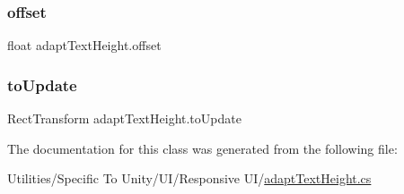 \mbox{\label{classadapt_text_height_ac9b7c41e38605d5ef479ddb6f9a4803b}} 
\subsubsection{\texorpdfstring{offset}{offset}}
{\footnotesize\ttfamily float adapt\+Text\+Height.\+offset}

\mbox{\label{classadapt_text_height_aab8f7f20bb5edb4f6011e2f276c273a1}} 
\subsubsection{\texorpdfstring{to\+Update}{toUpdate}}
{\footnotesize\ttfamily Rect\+Transform adapt\+Text\+Height.\+to\+Update}



The documentation for this class was generated from the following file\+:\begin{DoxyCompactItemize}
\item 
Utilities/\+Specific To Unity/\+U\+I/\+Responsive U\+I/\hyperlink{adapt_text_height_8cs}{adapt\+Text\+Height.\+cs}\end{DoxyCompactItemize}
